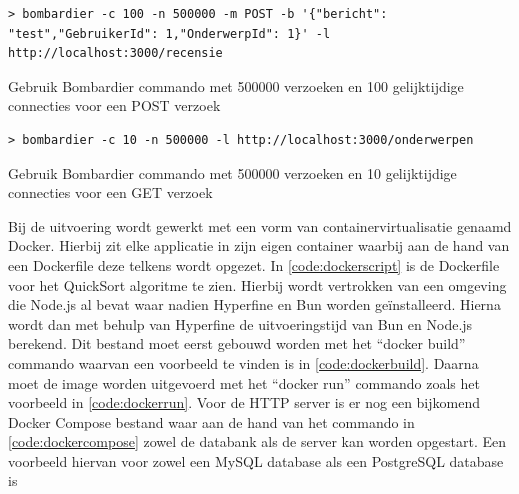 \begin{listing}[H]
  \centering
  \begin{verbatim}
> bombardier -c 100 -n 500000 -m POST -b '{"bericht": "test","GebruikerId": 1,"OnderwerpId": 1}' -l http://localhost:3000/recensie
      \end{verbatim}
      \caption[Gebruik Bombardier POST verzoek met 100 connecties]{\label{code:Bombardier1000}Gebruik Bombardier commando met 500000 verzoeken en 100 gelijktijdige connecties voor een POST verzoek}
\end{listing}
\begin{listing}[H]
  \centering
  \begin{verbatim}
> bombardier -c 10 -n 500000 -l http://localhost:3000/onderwerpen
      \end{verbatim}
      \caption[Gebruik Bombardier GET verzoek 10 connecties]{\label{code:Bombardier10GET}Gebruik Bombardier commando met 500000 verzoeken en 10 gelijktijdige connecties voor een GET verzoek}
\end{listing}
Bij de uitvoering wordt gewerkt met een vorm van containervirtualisatie genaamd Docker.
Hierbij zit elke applicatie in zijn eigen container waarbij aan de hand van een Dockerfile deze telkens wordt opgezet.
In \ref{code:dockerscript} is de Dockerfile voor het QuickSort algoritme te zien. 
Hierbij wordt vertrokken van een omgeving die Node.js al bevat waar nadien Hyperfine en Bun worden geïnstalleerd.
Hierna wordt dan met behulp van Hyperfine de uitvoeringstijd van Bun en Node.js berekend.
Dit bestand moet eerst gebouwd worden met het “docker build” commando waarvan een voorbeeld te vinden is in \ref{code:dockerbuild}.
Daarna moet de image worden uitgevoerd met het “docker run” commando zoals het voorbeeld in \ref{code:dockerrun}.
Voor de HTTP server is er nog een bijkomend
Docker Compose bestand waar aan de hand van het commando in \ref{code:dockercompose}
zowel de databank als de server kan worden opgestart. Een voorbeeld hiervan voor zowel een MySQL database als een PostgreSQL database is 
